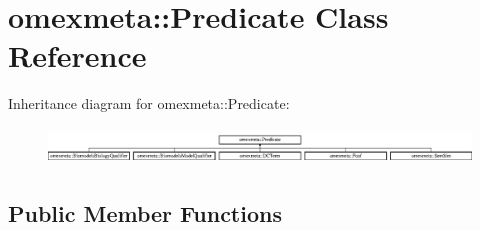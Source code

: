 \hypertarget{classomexmeta_1_1Predicate}{}\section{omexmeta\+:\+:Predicate Class Reference}
\label{classomexmeta_1_1Predicate}
Inheritance diagram for omexmeta\+:\+:Predicate\+:\begin{figure}[H]
\begin{center}
\leavevmode
\includegraphics[height=0.978166cm]{classomexmeta_1_1Predicate}
\end{center}
\end{figure}
\subsection*{Public Member Functions}
